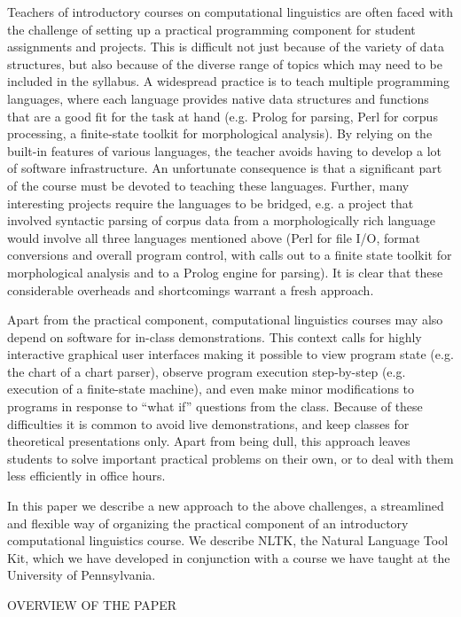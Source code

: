 \documentclass[11pt]{article}
\begin{document}
Teachers of introductory courses on computational linguistics are
often faced with the challenge of setting up a practical programming
component for student assignments and projects.  This is difficult not
just because of the variety of data structures, but also because of
the diverse range of topics which may need to be included in the
syllabus.  A widespread practice is to teach multiple programming
languages, where each language provides native data structures and functions
that are a good fit for the task at hand (e.g. Prolog for parsing,
Perl for corpus processing, a finite-state toolkit for morphological
analysis).  By relying on the built-in features of various languages,
the teacher avoids having to develop a lot of software infrastructure.
An unfortunate consequence is that a significant part of the course
must be devoted to teaching these languages.  Further, many
interesting projects require the languages to be bridged, e.g. a
project that involved syntactic parsing of corpus data from a
morphologically rich language would involve all three languages
mentioned above (Perl for file I/O, format conversions and overall
program control, with calls out to a finite state toolkit for
morphological analysis and to a Prolog engine for parsing).  It is
clear that these considerable overheads and shortcomings warrant a
fresh approach.

Apart from the practical component, computational linguistics courses
may also depend on software for in-class
demonstrations.  This context calls for highly interactive graphical
user interfaces making it possible to view program state (e.g. the
chart of a chart parser), observe program execution step-by-step
(e.g. execution of a finite-state machine), and even make minor
modifications to programs in response to ``what if'' questions from
the class.  Because of these difficulties it is common to avoid live
demonstrations, and keep classes for theoretical presentations only.
Apart from being dull, this approach leaves students to solve
important practical problems on their own, or to deal with them less
efficiently in office hours.

In this paper we describe a new approach to the above challenges,
a streamlined and flexible way of organizing the practical component
of an introductory computational linguistics course.  We describe
NLTK, the Natural Language Tool Kit, which we have developed in
conjunction with a course we have taught at the University of Pennsylvania.

OVERVIEW OF THE PAPER
\end{document}
